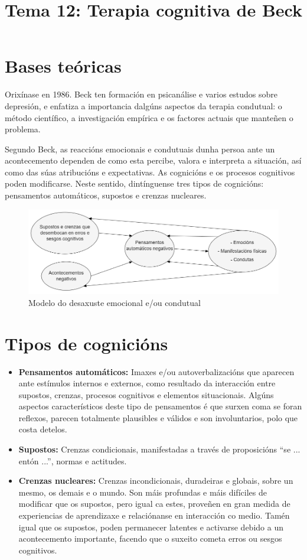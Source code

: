 \documentclass[a4paper,11pt]{article}
\title{Tema 12: Terapia cognitiva de Beck}
\date{}
\begin{document}
   

\maketitle 

\section{Bases teóricas}
Orixínase en 1986. Beck ten formación en psicanálise e varios estudos sobre depresión, e enfatiza a importancia dalgúns aspectos da terapia condutual: o método científico, a investigación empírica e os factores actuais que manteñen o problema. 

Segundo Beck, as reaccións emocionais e condutuais dunha persoa ante un acontecemento dependen de como esta percibe, valora e interpreta a situación, así como das súas atribucións e expectativas. As cognicións e os procesos cognitivos poden modificarse. Neste sentido, dintínguense tres tipos de cognicións: pensamentos automáticos, supostos e crenzas nucleares.

\begin{figure}[h!]
	\centering
	\includegraphics[width=0.46\linewidth]{tratamentos1_12_1}
	\caption{Modelo do desaxuste emocional e/ou condutual}
\end{figure}

\section{Tipos de cognicións}
\begin{itemize}
	\item \textbf{Pensamentos automáticos:} Imaxes e/ou autoverbalizacións que aparecen ante 
	estímulos internos e externos, como resultado da interacción entre supostos, crenzas, procesos 
	cognitivos e elementos situacionais. Algúns aspectos característicos deste tipo de pensamentos é 
	que surxen coma se foran reflexos, parecen totalmente plausibles e válidos e son involuntarios, 
	polo que costa detelos.
	\item \textbf{Supostos:} Crenzas condicionais, manifestadas a través de proposicións ``se ... 
	entón ...'', normas e actitudes. 
	\item \textbf{Crenzas nucleares:} Crenzas incondicionais, duradeiras e globais, sobre un mesmo, 
	os demais e o mundo. Son máis profundas e máis difíciles de modificar que os supostos, pero igual 
	ca estes, proveñen en gran medida de experiencias de aprendizaxe e relaciónanse en interacción co 
	medio. Tamén igual que os supostos, poden permanecer latentes e activarse debido a un 
	acontecemento importante, facendo que o suxeito cometa erros ou sesgos cognitivos.
\end{itemize}
\end{document}
